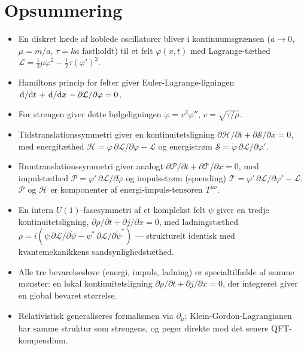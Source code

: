 \section{Opsummering}

\begin{itemize}
  \item En diskret kæde af koblede oscillatorer bliver i
        kontinuumsgrænsen ($a\to0$, $\mu=m/a$, $\tau=ka$ fastholdt)
        til et felt $\varphi(x,t)$ med Lagrange-tæthed
        $\mathcal{L}=\frac12\mu\dot\varphi^2-\frac12\tau(\varphi')^2$.
  \item Hamiltons princip for felter giver Euler-Lagrange-ligningen
        $\dv*{}{t}(\partial\mathcal{L}/\partial\dot\varphi) +
        \dv*{}{x}(\partial\mathcal{L}/\partial\varphi') -
        \partial\mathcal{L}/\partial\varphi = 0$.
  \item For strengen giver dette bølgeligningen
        $\ddot\varphi=v^2\varphi''$, $v=\sqrt{\tau/\mu}$.
  \item Tidstranslationssymmetri giver en kontinuitetsligning
        $\partial\mathcal{H}/\partial t + \partial\mathcal{S}/\partial x=0$,
        med energitæthed $\mathcal{H}=\dot\varphi\,\partial\mathcal{L}/\partial\dot\varphi-\mathcal{L}$
        og energistrøm $\mathcal{S}=\dot\varphi\,\partial\mathcal{L}/\partial\varphi'$.
  \item Rumtranslationssymmetri giver analogt
        $\partial\mathcal{P}/\partial t+\partial\mathcal{T}/\partial x=0$,
        med impulstæthed $\mathcal{P}=\varphi'\,\partial\mathcal{L}/\partial\dot\varphi$
        og impulsstrøm (spænding)
        $\mathcal{T}=\varphi'\,\partial\mathcal{L}/\partial\varphi'-\mathcal{L}$.
        $\mathcal{P}$ og $\mathcal{H}$ er komponenter af
        energi-impuls-tensoren $T^{\mu\nu}$.
  \item En intern $U(1)$-fasesymmetri af et komplekst felt $\psi$
        giver en tredje kontinuitetsligning,
        $\partial\rho/\partial t+\partial j/\partial x=0$, med
        ladningstæthed $\rho=i(\psi\,\partial\mathcal{L}/\partial\dot\psi-\psi^\ast\,\partial\mathcal{L}/\partial\dot\psi^\ast)$
        — strukturelt identisk med kvantemekanikkens
        sandsynlighedstæthed.
  \item Alle tre bevarelseslove (energi, impuls, ladning) er
        specialtilfælde af samme mønster: en lokal kontinuitetsligning
        $\partial\rho/\partial t+\partial j/\partial x=0$, der
        integreret giver en global bevaret størrelse.
  \item Relativistisk generaliseres formalismen via $\partial_\mu$;
        Klein-Gordon-Lagrangianen har samme struktur som strengens,
        og peger direkte mod det senere QFT-kompendium.
\end{itemize}

